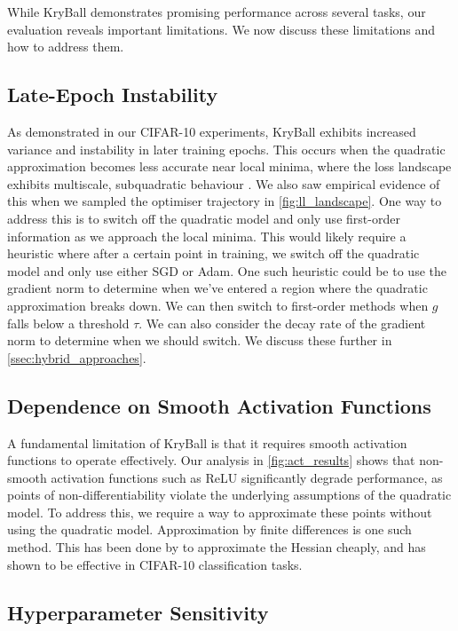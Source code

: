 While KryBall demonstrates promising performance across several tasks, our evaluation reveals important limitations. We now discuss these limitations and how to address them.

\subsection{Late-Epoch Instability}
\label{ssec:late_epoch_instability}

As demonstrated in our CIFAR-10 experiments, KryBall exhibits increased variance and instability in later training epochs. This occurs when the quadratic approximation becomes less accurate near local minima, where the loss landscape exhibits multiscale, subquadratic behaviour \citep{ma2022beyond}. We also saw empirical evidence of this when we sampled the optimiser trajectory in \cref{fig:ll_landscape}. One way to address this is to switch off the quadratic model and only use first-order information as we approach the local minima. This would likely require a heuristic where after a certain point in training, we switch off the quadratic model and only use either SGD or Adam. One such heuristic could be to use the gradient norm to determine when we've entered a region where the quadratic approximation breaks down. We can then switch to first-order methods when $g$ falls below a threshold $\tau$. We can also consider the decay rate of the gradient norm to determine when we should switch. We discuss these further in \cref{ssec:hybrid_approaches}.
    
\subsection{Dependence on Smooth Activation Functions}
\label{ssec:dependence_on_smooth_activation_functions}

A fundamental limitation of KryBall is that it requires smooth activation functions to operate effectively. Our analysis in \cref{fig:act_results} shows that non-smooth activation functions such as ReLU significantly degrade performance, as points of non-differentiability violate the underlying assumptions of the quadratic model. To address this, we require a way to approximate these points without using the quadratic model. Approximation by finite differences is one such method. This has been done by \cite{finite_diff} to approximate the Hessian cheaply, and has shown to be effective in CIFAR-10 classification tasks.

\subsection{Hyperparameter Sensitivity}
\label{ssec:hyperparameter_sensitivity}

